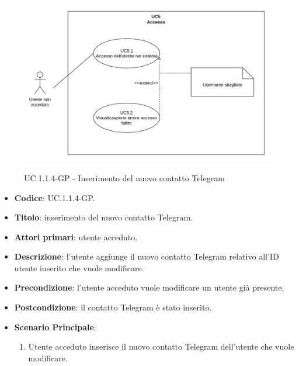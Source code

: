 				\begin{figure}[H]
					\centering
					\includegraphics[width=\columnwidth]{img/UC5.png}\\
					\caption{UC\theuccount.1.1.4-GP - Inserimento del nuovo contatto Telegram}
				\end{figure}
				\begin{itemize}
					\item \textbf{Codice}: UC\theuccount.1.1.4-GP.
					\item \textbf{Titolo}: inserimento del nuovo contatto Telegram.
					\item \textbf{Attori primari}: utente acceduto.
					\item \textbf{Descrizione}: l'utente aggiunge il nuovo contatto Telegram relativo all'ID utente inserito che vuole modificare.
					\item \textbf{Precondizione}: l'utente acceduto vuole modificare un utente già presente.
					\item \textbf{Postcondizione}: il contatto Telegram è stato inserito.
					\item \textbf{Scenario Principale}:
					\begin{enumerate}
						\item Utente acceduto inserisce il nuovo contatto Telegram dell'utente che vuole modificare.
					\end{enumerate}
				\end{itemize}
		
